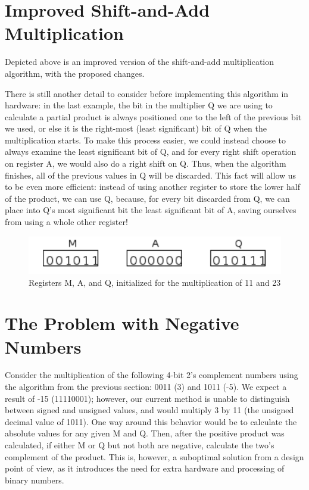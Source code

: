 \documentclass{article}
\begin{document}
\section{Improved Shift-and-Add Multiplication}
Depicted above is an improved version of the shift-and-add multiplication algorithm, with the proposed changes.

There is still another detail to consider before implementing this algorithm in hardware: in the last example, the bit in the multiplier Q we are using to calculate a partial product is always positioned one to the left of the previous bit we used, or else it is the right-most (least significant) bit of Q when the multiplication starts.
To make this process easier, we could instead choose to always examine the least significant bit of Q, and for every right shift operation on register A, we would also do a right shift on Q.
Thus, when the algorithm finishes, all of the previous values in Q will be discarded.
This fact will allow us to be even more efficient: instead of using another register to store the lower half of the product, we can use Q, because, for every bit discarded from Q, we can place into Q's most significant bit the least significant bit of A, saving ourselves from using a whole other register!

\pagebreak
\begin{figure}
\centering
\includegraphics{init.pdf}
\caption{Registers M, A, and Q, initialized for the multiplication of 11 and 23}
\end{figure}

\section{The Problem with Negative Numbers}
Consider the multiplication of the following 4-bit 2's complement numbers using the algorithm from the previous section: 0011 (3) and 1011 (-5).
We expect a result of -15 (11110001); however, our current method is unable to distinguish between signed and unsigned values, and would multiply 3 by 11 (the unsigned decimal value of 1011).
One way around this behavior would be to calculate the absolute values for any given M and Q.
Then, after the positive product was calculated, if either M or Q but not both are negative, calculate the two's complement of the product.
This is, however, a suboptimal solution from a design point of view, as it introduces the need for extra hardware and processing of binary numbers.
\end{document}

